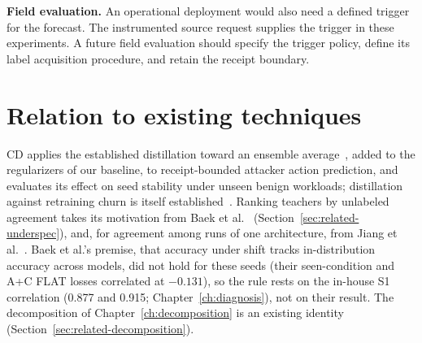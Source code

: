 \textbf{Field evaluation.}
An operational deployment would also need a defined trigger for the
forecast. The instrumented source request supplies the trigger in these
experiments. A future field evaluation should specify the trigger
policy, define its label acquisition procedure, and retain the receipt
boundary.

\section{Relation to existing techniques}
\label{sec:disc-novelty}

CD applies the established distillation toward an ensemble
average~\cite{hinton2015distilling}, added to the regularizers of our
baseline, to receipt-bounded attacker action prediction, and
evaluates its effect on seed stability under unseen benign workloads;
distillation against retraining churn is itself
established~\cite{anil2018large,jiang2022churn,hidey2022reducing}.
Ranking teachers by
unlabeled agreement takes its motivation from Baek et
al.~\cite{baek2022agreement} (Section~\ref{sec:related-underspec}),
and, for agreement among runs of one architecture, from Jiang et
al.~\cite{jiang2022assessing}. Baek et al.'s premise, that accuracy
under shift tracks in-distribution accuracy across models, did not hold
for these seeds (their seen-condition and A+C FLAT losses correlated
at $-0.131$), so the rule rests on the in-house S1 correlation (0.877
and 0.915; Chapter~\ref{ch:diagnosis}), not on their result.
The
decomposition of Chapter~\ref{ch:decomposition} is an existing
identity (Section~\ref{sec:related-decomposition}).
